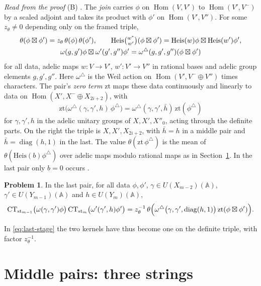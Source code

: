 \documentclass[reqno]{amsart}
\theoremstyle{definition}
\newtheorem{problem}{Problem}[section]
\theoremstyle{plain}
\theoremstyle{remark}
\newcommand{\A}{\mathbb{A}}
\newcommand{\Hom}{\operatorname{Hom}}
\newcommand{\Heis}{\mathrm{Heis}}
\newcommand{\st}{\mathrm{st}}
\newcommand{\CT}{\mathrm{CT}}
\newcommand{\zt}{\mathrm{zt}}
\newcommand{\diag}{\operatorname{diag}}
\begin{document}
\emph{Read from the proof} (B) \cite[TwoEdges, lines 71--78, 128, 147, 195]{GL}.  The \emph{join} carries \(\phi\) on \(\Hom(V,V')\) to \(\Hom(V',V^-)\) by a scaled adjoint and takes its product with \(\phi'\) on \(\Hom(V',V'')\).  For some \(z_\theta\ne0\) depending only on the framed triple,
\begin{gather*}
  \theta(\phi \boxtimes \phi') = z_\theta\,\theta(\phi)\,\theta(\phi') , \qquad
  \Heis\tbinom{w^*}{w'}(\phi \boxtimes \phi') = \Heis(w)\phi \boxtimes \Heis(w')\phi' , \\
  \omega(g, g')\phi \boxtimes \omega'(g', g'')\phi' = \omega^\triangle(g, g', g'')(\phi \boxtimes \phi')
\end{gather*}
for all data, adelic maps \(w:V\to V'\), \(w':V'\to V''\) in rational bases and adelic group elements \(g,g',g''\).  Here \(\omega^\triangle\) is the Weil action on \(\Hom(V',V^-\oplus V'')\) times characters.  The pair's \emph{zero term} \(\zt\) maps these data continuously and linearly to data on \(\Hom(X',X^-\oplus X_{2i+2})\), with
\[
  \zt\bigl(\omega^\triangle(\gamma, \gamma', h)\,\phi^\triangle\bigr) = \omega^\triangle(\gamma, \gamma', \bar h)\,\zt(\phi^\triangle)
\]
for \(\gamma,\gamma',h\) in the adelic unitary groups of \(X,X',X''_0\), acting through the definite parts.  On the right the triple is \(X,X',X_{2i+2}\), with \(\bar h=h\) in a middle pair and \(\bar h=\diag(h,1)\) in the last.  The value \(\theta(\zt\,\phi^\triangle)\) is the mean of \(\theta(\Heis(b)\phi^\triangle)\) over adelic maps modulo rational maps as in Section~\ref{sec:strings}.  In the last pair only \(b=0\) occurs \cite[EdgePairEvaluation, lines 844, 929, and ZeroTerm, line 141]{GL}.

\begin{problem}\label{pr:last-two}
In the last pair, for all data \(\phi, \phi'\), \(\gamma \in U(X_{m-2})(\A)\), \(\gamma' \in U(Y_{m-1})(\A)\) and \(h \in U(Y_m)(\A)\),
\[
  \CT_{\st_{m-1}}\bigl(\omega(\gamma, \gamma')\phi\bigr)\,\CT_{\st_m}\bigl(\omega'(\gamma', h)\phi'\bigr) = z_\theta^{-1}\,\theta\Bigl(\omega^\triangle\bigl(\gamma, \gamma', \diag(h, 1)\bigr)\,\zt(\phi \boxtimes \phi')\Bigr) .
\]
\end{problem}

In \eqref{eq:last-stage} the two kernels have thus become one on the definite triple, with factor \(z_\theta^{-1}\).


\section{Middle pairs: three strings}\label{sec:strings}
\end{document}
